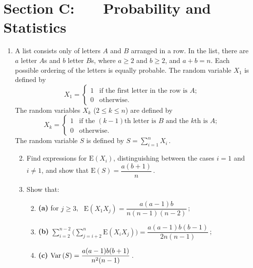\documentclass[a4, 11pt]{report}
\newlength{\qspace}
\newcounter{qnumber}
\newenvironment{question}%
 {\vspace{\qspace}
  \begin{enumerate}[\bfseries 1\quad][10]%
    \setcounter{enumi}{\value{qnumber}}%
    \item%
 }
{
  \end{enumerate}
  \filbreak
  \stepcounter{qnumber}
 }
\newenvironment{questionparts}[1][1]%
 {
  \begin{enumerate}[\bfseries (i)]%
    \setcounter{enumii}{#1}
    \addtocounter{enumii}{-1}
    \setlength{\itemsep}{5mm}
    \setlength{\parskip}{8pt}
 }
 {
  \end{enumerate}
 }
\def\E{{\mathrm E}}
\def\le{\leqslant}
\def\ge{\geqslant}
\def\var{{\rm Var}\,}
\newcommand{\ds}{\displaystyle}
\begin{document}
	
	\newpage
\section*{Section C: \ \ \ Probability and Statistics}


\begin{question}
A list consists only of letters $A$ and $B$ arranged in 
a row. In the list, there are 
$a$ letter $A$s and $b$ letter $B$s, where $a\ge2$ and $b\ge2$, and
  $a+b=n$.
Each possible ordering of the letters is equally probable.
The random variable $X_1$ is defined by
\[
X_1 = 
\begin{cases}
1 & \text{if the first letter in the row is $A$};\\
0 & \text{otherwise.}
\end{cases}
\]
The random variables $X_k$ ($2 \le k \le n$) are defined by
\[
X_k = 
\begin{cases}
1 & \text{if the $(k-1)$th  letter  is $B$ and the $k$th is $A$};\\
0 & \text{otherwise.}
\end{cases}
\]
The random variable $S$ is defined by $S = \sum\limits_ {i=1}^n X_i\,$.
\begin{questionparts}
\item Find expressions for $\E(X_i)$, 
distinguishing between the cases $i=1$ and $i\ne1$, and show
that $\E(S)= \dfrac{a(b+1)}n\,$.
\item Show that:
\begin{questionparts}
\item[\bf (a)] for $j\ge3$, \  $\E(X_1X_j) = \dfrac{a(a-1)b}{n(n-1)(n-2)}\,$;

\item[\bf (b)] $\ds \sum\limits_{i=2}^{n-2} \bigg( \sum\limits_{j=i+2}^n \E(X_iX_j)\bigg)
= \dfrac{a(a-1)b(b-1)}{2n(n-1)}\,$;

\item[\bf (c)] $\var(S) = \dfrac {a(a-1)b(b+1)}{n^2(n-1)}\,$.
\end{questionparts}
\end{questionparts}
\end{question}
\end{document}
